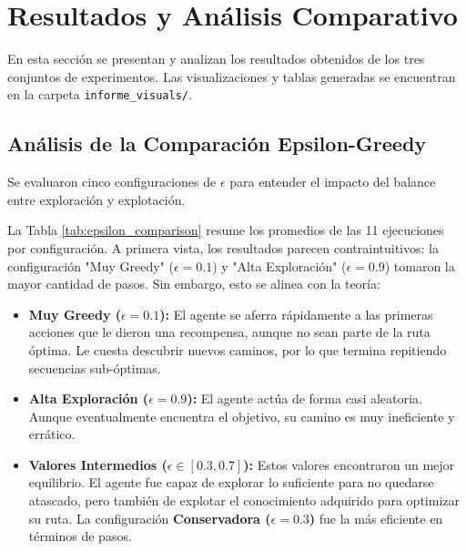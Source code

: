 \documentclass[12pt, oneside, openany]{book}
\begin{document}
\section{Resultados y Análisis Comparativo}
\label{sec:resultados}

En esta sección se presentan y analizan los resultados obtenidos de los tres conjuntos de experimentos. Las visualizaciones y tablas generadas se encuentran en la carpeta \texttt{informe\_visuals/}.

\subsection{Análisis de la Comparación Epsilon-Greedy}
Se evaluaron cinco configuraciones de $\epsilon$ para entender el impacto del balance entre exploración y explotación.



La Tabla \ref{tab:epsilon_comparison} resume los promedios de las 11 ejecuciones por configuración. A primera vista, los resultados parecen contraintuitivos: la configuración "Muy Greedy" ($\epsilon=0.1$) y "Alta Exploración" ($\epsilon=0.9$) tomaron la mayor cantidad de pasos. Sin embargo, esto se alinea con la teoría:
\begin{itemize}
    \item \textbf{Muy Greedy ($\epsilon=0.1$):} El agente se aferra rápidamente a las primeras acciones que le dieron una recompensa, aunque no sean parte de la ruta óptima. Le cuesta descubrir nuevos caminos, por lo que termina repitiendo secuencias sub-óptimas.
    \item \textbf{Alta Exploración ($\epsilon=0.9$):} El agente actúa de forma casi aleatoria. Aunque eventualmente encuentra el objetivo, su camino es muy ineficiente y errático.
    \item \textbf{Valores Intermedios ($\epsilon \in [0.3, 0.7]$):} Estos valores encontraron un mejor equilibrio. El agente fue capaz de explorar lo suficiente para no quedarse atascado, pero también de explotar el conocimiento adquirido para optimizar su ruta. La configuración \textbf{Conservadora ($\epsilon=0.3$)} fue la más eficiente en términos de pasos.
\end{itemize}
\end{document}
